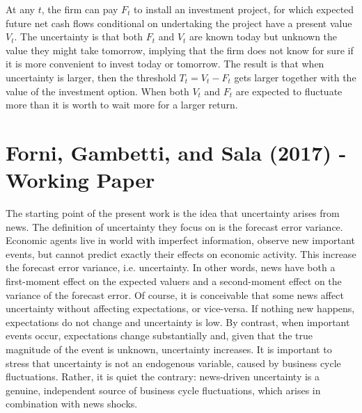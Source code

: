 \documentclass{article}
\begin{document}
{At any $t$, the firm can pay $F_t$ to install an investment project, for which expected future net cash flows conditional on undertaking the project have a present value $V_t$. The uncertainty is that both $F_t$ and $V_t$ are known today but unknown the value they might take tomorrow, implying that the firm does not know for sure if it is more convenient to invest today or tomorrow. The result is that when uncertainty is larger, then the threshold $T_t = V_t - F_t$ gets larger together with the value of the investment option. When both $V_t$ and $F_t$ are expected to fluctuate more than it is worth to wait more for a larger return. 

\section{Forni, Gambetti, and Sala (2017) - Working Paper}

The starting point of the present work is the idea that uncertainty arises from news. The definition of uncertainty they focus on is the forecast error variance. Economic agents live in world with imperfect information, observe new important events, but cannot predict exactly their effects on economic activity. This increase the forecast error variance, i.e. uncertainty. In other words, news have both a first-moment effect on the expected valuers and a second-moment effect on the variance of the forecast error. Of course, it is conceivable that some news affect uncertainty without affecting expectations, or vice-versa. If nothing new happens, expectations do not change and uncertainty is low. By contrast, when important events occur, expectations change substantially and, given that the true magnitude of the event is unknown, uncertainty increases. It is important to stress that uncertainty is not an endogenous variable, caused by business cycle fluctuations. Rather, it is quiet the contrary: news-driven uncertainty is a genuine, independent source of business cycle fluctuations, which arises in combination with news shocks.

}
\end{document}
